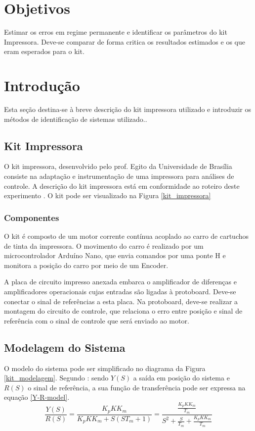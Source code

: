 \section{Objetivos}

Estimar os erros em regime permanente e identificar os parâmetros do kit Impressora. Deve-se comparar de forma critica os resultados estimados e os que eram esperados para o kit.

\section{Introdução}
Esta seção destina-se à breve descrição do kit impressora utilizado e introduzir os métodos de identificação de sistemas utilizado..

\subsection{Kit Impressora}
O kit impressora, desenvolvido pelo prof. Egito da Universidade de Brasília consiste na adaptação e instrumentação de uma impressora para análises de controle.  A descrição do kit impressora está em conformidade ao roteiro deste experimento \cite{CDIN:Roteiro1}. O kit pode ser visualizado na Figura \ref{kit_impressora}



\subsubsection{Componentes}
O kit é composto de um motor  corrente contínua acoplado ao carro de cartuchos de tinta da impressora. O movimento do carro é realizado por um microcontrolador Arduíno Nano, que envia comandos por uma ponte H e monitora a posição do carro por meio de um Encoder. 

A placa de circuito impresso anexada embarca o amplificador de diferenças e amplificadores operacionais cujas entradas são ligadas à protoboard. Deve-se conectar o sinal de referências a esta placa. Na protoboard, deve-se realizar a montagem do circuito de controle, que relaciona o erro entre posição e sinal de referência com o sinal de controle que será enviado ao motor.

\subsection{Modelagem do Sistema}
O modelo do sistema pode ser simplificado no diagrama da Figura \ref{kit_modelagem}. Segundo \cite{CDIN:Roteiro1}: sendo $Y(S)$ a saída em posição do sistema e $R(S)$ o sinal de referência, a sua função de transferência pode ser expressa na equação \ref{Y-R-model}.
\begin{equation}
\frac{Y(S)}{R(S)} = \frac{ K_p K K_m  }{ K_p K K_m + S(ST_m +1) } = \frac{\frac{K_p K K_m}{T_m}}{S^2+ \frac{S}{T_m}+ \frac{K_p K K_m}{T_m}} 
\label{Y-R-model}
\end{equation}

